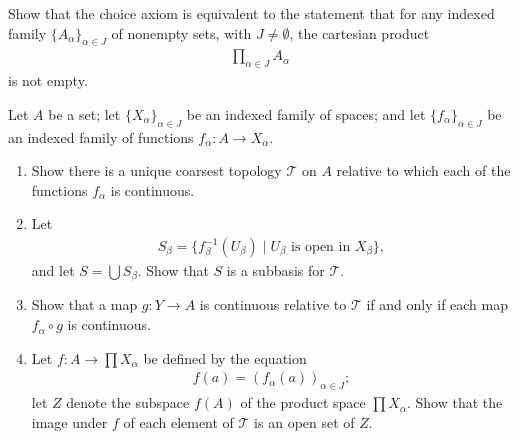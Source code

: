   \begin{exercise}[Munkres 19.9]
    Show that the choice axiom is equivalent to the statement that for any indexed family $\{A_\alpha\}_{\alpha \in J}$ of nonempty sets, with $J \neq \emptyset$, the cartesian product
    \begin{align*}
      \prod_{\alpha \in J} A_\alpha
    \end{align*}
    is not empty.
  \end{exercise}

  \begin{exercise}[Munkres 19.10]
    Let $A$ be a set; let $\{X_\alpha\}_{\alpha \in J}$ be an indexed family of spaces; and let $\{f_\alpha\}_{\alpha \in J}$ be an indexed family of functions $f_\alpha : A \to X_\alpha$.
    \begin{enumerate}
      \item Show there is a unique coarsest topology $\mathcal{T}$ on $A$ relative to which each of the functions $f_\alpha$ is continuous.
      \item Let
      \begin{align*}
        S_\beta = \{f_\beta^{-1}(U_\beta) \mid U_\beta \text{ is open in } X_\beta\},
      \end{align*}
      and let $S = \bigcup S_\beta$. Show that $S$ is a subbasis for $\mathcal{T}$.
      \item Show that a map $g : Y \to A$ is continuous relative to $\mathcal{T}$ if and only if each map $f_\alpha \circ g$ is continuous.
      \item Let $f : A \to \prod X_\alpha$ be defined by the equation
      \begin{align*}
        f(a) = (f_\alpha(a))_{\alpha \in J};
      \end{align*}
      let $Z$ denote the subspace $f(A)$ of the product space $\prod X_\alpha$. Show that the image under $f$ of each element of $\mathcal{T}$ is an open set of $Z$.
    \end{enumerate}
  \end{exercise}


